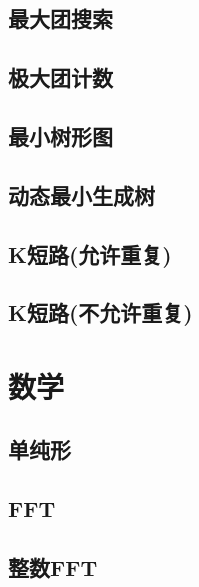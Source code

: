 \documentclass[10pt]{article}
\begin{document}
	\subsection{最大团搜索}
		
	
	\subsection{极大团计数}
		

	\subsection{最小树形图}
		

	\subsection{动态最小生成树}
		

	\subsection{K短路(允许重复)}
		

	\subsection{K短路(不允许重复)}
		

\section{数学}
	\subsection{单纯形}
		

	\subsection{FFT}
		

	\subsection{整数FFT}
		
\end{document}
